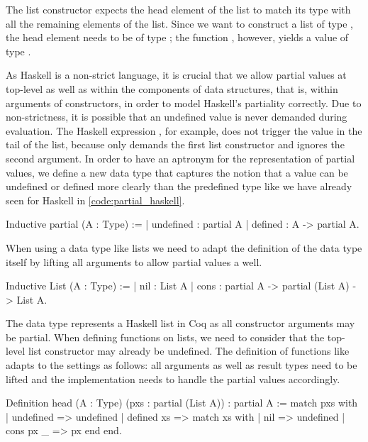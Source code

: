 The list constructor  expects the head element of the list to match its type with all the remaining elements of the list.
Since we want to construct a list of type , the head element needs to be of type ; the function , however, yields a value of type .

As Haskell is a non\--strict language, it is crucial that we allow partial values at top\--level as well as within the components of data structures, that is, within arguments of constructors, in order to model Haskell's partiality correctly.
Due to non\--strictness, it is possible that an undefined value is never demanded during evaluation.
The Haskell expression , for example, does not trigger the  value in the tail of the list, because  only demands the first list constructor and ignores the second argument.
In order to have an aptronym for the representation of partial values, we define a new data type  that captures the notion that a value can be undefined or defined more clearly than the predefined type  like we have already seen for Haskell in \autoref{code:partial_haskell}.

\begin{coqcode}
Inductive partial (A : Type) :=
| undefined : partial A
| defined   : A -> partial A.
\end{coqcode}

When using a data type like lists we need to adapt the definition of the data type itself by lifting all arguments to allow partial values a well.

\begin{coqcode}
Inductive List (A : Type) :=
| nil : List A
| cons : partial A -> partial (List A) -> List A.
\end{coqcode}

The data type  represents a Haskell list in Coq as all constructor arguments may be partial.
When defining functions on lists, we need to consider that the top\--level list constructor may already be undefined.
The definition of  functions like  adapts to the settings as follows: all arguments as well as result types need to be lifted and the implementation needs to handle the partial values accordingly.

\begin{coqcode}
Definition head (A : Type) (pxs : partial (List A)) : partial A :=
  match pxs with
  | undefined  => undefined
  | defined xs => match xs with
                 | nil       => undefined
                 | cons px _ => px
                 end
  end.
\end{coqcode}

